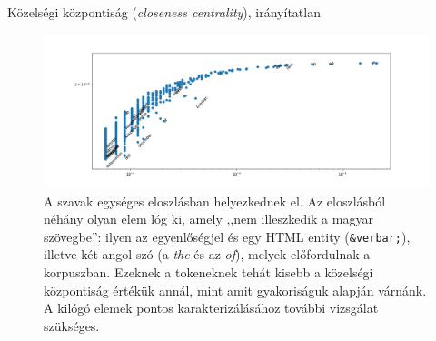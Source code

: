 \documentclass{beamer}
\newlength{\twocolwid}
\newcommand{\liex}[1]{\emph{#1}}
\begin{document}
\begin{frame}[t]
\begin{columns}[t]
\begin{column}{\twocolwid}
                  \begin{block}%
                    {Közelségi központiság (\emph{closeness centrality}),
                    irányítatlan} 
                    \begin{figure}[h]
                      \includegraphics[width=.7\columnwidth]{img/current-flow-closeness.png}
                      \caption{%
                        A szavak egységes eloszlásban helyezkednek el.
                      Az eloszlásból néhány olyan elem lóg ki, amely
                      ,,nem illeszkedik a magyar szövegbe'':
                      ilyen az egyenlőségjel és egy HTML entity ({\tt \&verbar;}),
                      illetve két angol szó (a \liex{the} és az \liex{of}),
                      melyek előfordulnak a korpuszban.
                      Ezeknek a tokeneknek tehát kisebb
                      a közelségi központiság értékük annál,
                      mint amit gyakoriságuk alapján várnánk.
                      A kilógó elemek pontos karakterizálásához további vizsgálat szükséges.
                      }

                      \label{fig:closeness}
                    \end{figure}
                    \end{block}

        \bigskip


\end{column}
\end{columns}
\end{frame}
\end{document}
